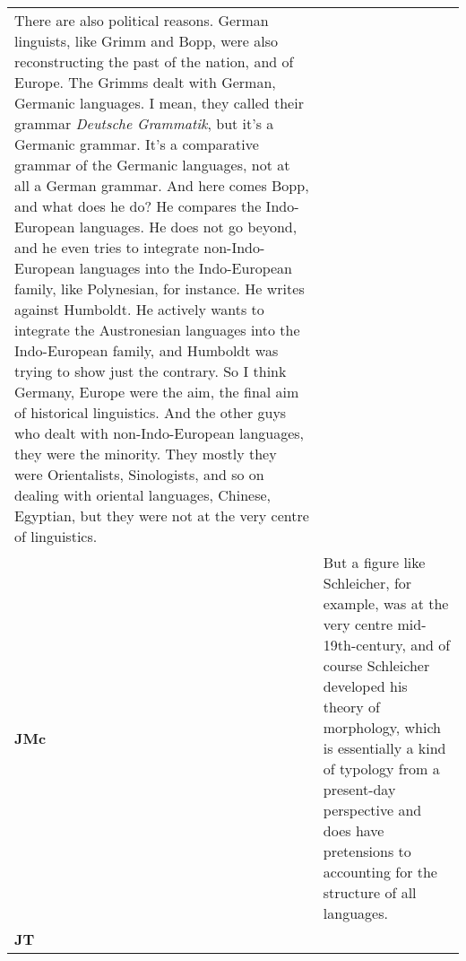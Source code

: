 \documentclass[12pt]{article}
\begin{document}
\begin{flushleft}
\begin{supertabular}{m{0.24415985in}m{5.89766in}}
There are also political reasons. German linguists, like Grimm and Bopp, were also reconstructing the past of the nation, and of Europe. The Grimms dealt with German, Germanic languages. I mean, they called their grammar \textit{Deutsche Grammatik}, but it’s a Germanic grammar. It’s a comparative grammar of the Germanic languages, not at all a German grammar. And here comes Bopp, and what does he do? He compares the Indo-European languages. He does not go beyond, and he even tries to integrate non-Indo-European languages into the Indo-European family, like Polynesian, for instance. He writes against Humboldt. He actively wants to integrate the Austronesian languages into the Indo-European family, and Humboldt was trying to show just the contrary. So I think Germany, Europe were the aim, the final aim of historical linguistics. And the other guys who dealt with non-Indo-European languages, they were the minority. They mostly they were Orientalists, Sinologists, and so on dealing with oriental languages, Chinese, Egyptian, but they were not at the very centre of linguistics.\\
\textbf{JMc}\newline
 &
But a figure like Schleicher, for example, was at the very centre mid-19th-century, and of course Schleicher developed his theory of morphology, which is essentially a kind of typology from a present-day perspective and does have pretensions to accounting for the structure of all languages.\\
\textbf{JT}\newline
 &

\end{supertabular}
\end{flushleft}
\end{document}
